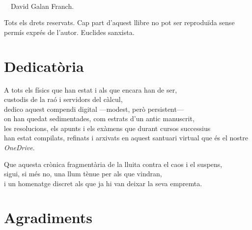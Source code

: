 \documentclass[12pt, a5paper, twoside]{book}
\let\cleardoublepage\clearpage %
\begin{document}

\begin{titlepage}
\thispagestyle{empty}
\vfill
~
\end{titlepage}
\cleardoublepage

\thispagestyle{empty}
\newpage
\vspace*{5cm}
\noindent\textcopyright\
\the\year\ David Galan Franch.

Tots els drets reservats. Cap part d’aquest llibre no pot ser reproduïda sense permís exprés de l'autor. Euclides sanxista.

\cleardoublepage

\chapter*{Dedicatòria}
\vspace{2cm}

\noindent
A tots els físics que han estat i als que encara han de ser,\\
custodis de la raó i servidors del càlcul,\\
dedico aquest compendi digital ---modest, però persistent---\\
on han quedat sedimentades, com estrats d’un antic manuscrit,\\
les resolucions, els apunts i els exàmens que durant cursos successius\\
han estat compilats, refinats i arxivats en aquest santuari virtual que és el nostre \textit{OneDrive}.\\

\medskip

\noindent
Que aquesta crònica fragmentària de la lluita contra el caos i el suspens,\\
sigui, si més no, una llum tènue per als que vindran,\\
i un homenatge discret als que ja hi van deixar la seva empremta.

\cleardoublepage

\chapter*{Agradiments}
\end{document}
